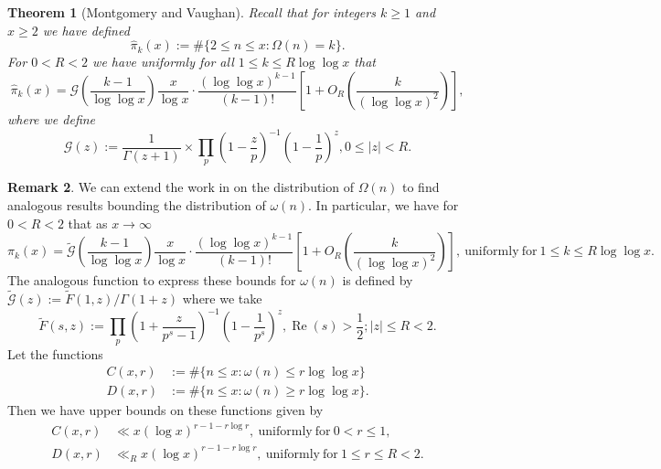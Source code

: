 \documentclass[11pt,reqno,a4letter]{article}
\numberwithin{figure}{section}
\numberwithin{table}{section}
\theoremstyle{plain}
\newtheorem{theorem}{Theorem}
\numberwithin{theorem}{section}
\theoremstyle{definition}
\newtheorem{remark}[theorem]{Remark}
\renewcommand{\Re}{\operatorname{Re}}
\begin{document}
\begin{theorem}[Montgomery and Vaughan]
\label{theorem_HatPi_ExtInTermsOfGz} 
Recall that for integers $k \geq 1$ and $x \geq 2$ we have defined 
$$\widehat{\pi}_k(x) := \#\{2 \leq n \leq x: \Omega(n)=k\}.$$ 
For $0 < R < 2$ we have uniformly for all $1 \leq k \leq R \log\log x$ that 
\[
\widehat{\pi}_k(x) = \mathcal{G}\left(\frac{k-1}{\log\log x}\right) \frac{x}{\log x} \cdot 
     \frac{(\log\log x)^{k-1}}{(k-1)!} \left[1 + O_R\left(\frac{k}{(\log\log x)^2}\right)\right], 
\]
where we define 
\[
\mathcal{G}(z) := \frac{1}{\Gamma(z+1)} \times 
     \prod_p \left(1-\frac{z}{p}\right)^{-1} \left(1-\frac{1}{p}\right)^z, 0 \leq |z| < R. 
\]
\end{theorem} 

\begin{remark} 
\label{remark_MV_Pikx_FuncResultsAnnotated_v1} 
We can extend the work in \cite{MV} on the distribution of $\Omega(n)$ to find 
analogous results bounding the distribution of $\omega(n)$. In particular, we have 
for $0 < R < 2$ that as $x \rightarrow \infty$ 
\begin{equation}
\label{eqn_Pikx_UniformAsymptoticsStmt_from_MV_v2} 
\pi_k(x) = \widetilde{\mathcal{G}}\left(\frac{k-1}{\log\log x}\right) 
     \frac{x}{\log x} \cdot \frac{(\log\log x)^{k-1}}{(k-1)!} \left[ 
     1 + O_R\left(\frac{k}{(\log\log x)^2}\right) 
     \right], 
     \mathrm{\ uniformly\ for\ } 1 \leq k \leq R\log\log x. 
\end{equation}
The analogous function to express these bounds for $\omega(n)$ is 
defined by $\widetilde{\mathcal{G}}(z) := \widetilde{F}(1, z) / \Gamma(1 + z)$ where 
we take 
\[
\widetilde{F}(s, z) := \prod_p \left(1 + \frac{z}{p^s-1}\right)^{-1} \left(1 - \frac{1}{p^s}\right)^{z}, 
     \Re(s) > \frac{1}{2}; |z| \leq R < 2. 
\]
Let the functions 
\begin{align*} 
C(x, r) & := \#\{n \leq x: \omega(n) \leq r \log\log x\} \\ 
D(x, r) & := \#\{n \leq x: \omega(n) \geq r \log\log x\}. 
\end{align*} 
Then we have upper bounds on these functions given by 
\begin{align*} 
C(x, r) & \ll x (\log x)^{r - 1 - r \log r}, \mathrm{\ uniformly\ for\ } 0 < r \leq 1, \\ 
D(x, r) & \ll_R x (\log x)^{r - 1 - r \log r}, \mathrm{\ uniformly\ for\ } 1 \leq r \leq R < 2.
\end{align*} 
\end{remark} 
\end{document}
